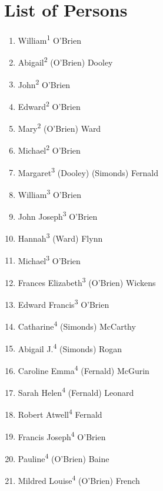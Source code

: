 \chapter{List of Persons}
\begin{enumerate}
	\item\label{per:William1OBrien}William\textsuperscript{1} O'Brien
	\item\label{per:Abigail2OBrien}Abigail\textsuperscript{2} (O'Brien) Dooley
	\item\label{per:John2OBrien}John\textsuperscript{2} O'Brien
	\item\label{per:Edward2OBrien}Edward\textsuperscript{2} O'Brien
	\item\label{per:Mary2OBrien}Mary\textsuperscript{2} (O'Brien) Ward
	\item\label{per:Michael2OBrien}Michael\textsuperscript{2} O'Brien
	\item\label{per:Margaret3Dooley}Margaret\textsuperscript{3} (Dooley) (Simonds) Fernald
	\item\label{per:William3OBrien}William\textsuperscript{3} O'Brien
	\item\label{per:John3OBrien}John Joseph\textsuperscript{3} O'Brien
	\item\label{per:Hannah3Ward}Hannah\textsuperscript{3} (Ward) Flynn
	\item\label{per:Michael3OBrien}Michael\textsuperscript{3} O'Brien
	\item\label{per:Frances3OBrien}Frances Elizabeth\textsuperscript{3} (O'Brien) Wickens
	\item\label{per:Edward3OBrien}Edward Francis\textsuperscript{3} O'Brien
	\item\label{per:Catharine4Simonds}Catharine\textsuperscript{4} (Simonds) McCarthy
	\item\label{per:Abigail4Simonds}Abigail J.\textsuperscript{4} (Simonds) Rogan
	\item\label{per:Caroline4Fernald}Caroline Emma\textsuperscript{4} (Fernald) McGurin
	\item\label{per:Sarah4Fernald}Sarah Helen\textsuperscript{4} (Fernald) Leonard
	\item\label{per:Robert4Fernald}Robert Atwell\textsuperscript{4} Fernald
	\item\label{per:Francis4OBrien}Francis Joseph\textsuperscript{4} O'Brien
	\item\label{per:Pauline4OBrien}Pauline\textsuperscript{4} (O'Brien) Baine
	\item\label{per:Mildred4OBrien}Mildred Louise\textsuperscript{4} (O'Brien) French

\end{enumerate}
